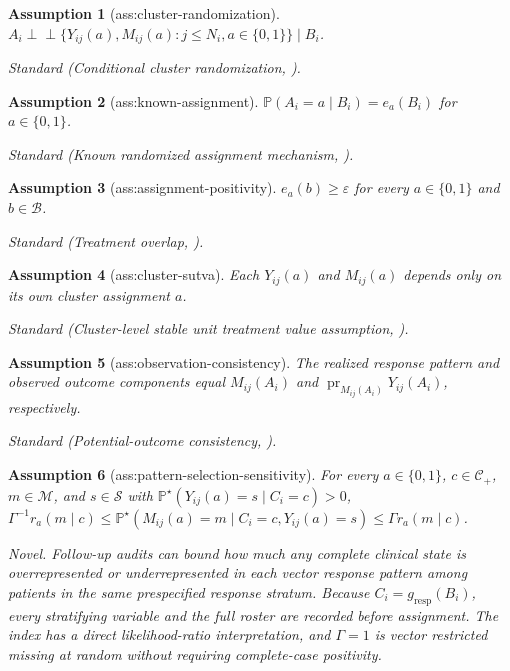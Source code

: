 \documentclass{article}
\newtheorem{assumption}{Assumption}
\begin{document}
\begin{assumption}[ass:cluster-randomization]\label{ass:cluster-randomization}
\(A_i\perp\!\!\perp\{Y_{ij}(a),M_{ij}(a):j\le N_i,a\in\{0,1\}\}\mid B_i\).
\par\smallskip\noindent\emph{Standard} (Conditional cluster randomization, \cite{WangParkSmallLi2024}).
\end{assumption}

\begin{assumption}[ass:known-assignment]\label{ass:known-assignment}
\(\mathbb P(A_i=a\mid B_i)=e_a(B_i)\) for \(a\in\{0,1\}\).
\par\smallskip\noindent\emph{Standard} (Known randomized assignment mechanism, \cite{WangParkSmallLi2024}).
\end{assumption}

\begin{assumption}[ass:assignment-positivity]\label{ass:assignment-positivity}
\(e_a(b)\ge\varepsilon\) for every \(a\in\{0,1\}\) and \(b\in\mathcal B\).
\par\smallskip\noindent\emph{Standard} (Treatment overlap, \cite{WangParkSmallLi2024}).
\end{assumption}

\begin{assumption}[ass:cluster-sutva]\label{ass:cluster-sutva}
Each \(Y_{ij}(a)\) and \(M_{ij}(a)\) depends only on its own cluster assignment \(a\).
\par\smallskip\noindent\emph{Standard} (Cluster-level stable unit treatment value assumption, \cite{HayesMoulton2017}).
\end{assumption}

\begin{assumption}[ass:observation-consistency]\label{ass:observation-consistency}
The realized response pattern and observed outcome components equal \(M_{ij}(A_i)\) and \(\operatorname{pr}_{M_{ij}(A_i)}Y_{ij}(A_i)\), respectively.
\par\smallskip\noindent\emph{Standard} (Potential-outcome consistency, \cite{Rubin1974}).
\end{assumption}

\begin{assumption}[ass:pattern-selection-sensitivity]\label{ass:pattern-selection-sensitivity}
For every \(a\in\{0,1\}\), \(c\in\mathcal C_{+}\), \(m\in\mathcal M\), and \(s\in\mathcal S\) with \(\mathbb P^{\star}(Y_{ij}(a)=s\mid C_i=c)>0\), \(\Gamma^{-1}r_a(m\mid c)\le\mathbb P^{\star}(M_{ij}(a)=m\mid C_i=c,Y_{ij}(a)=s)\le\Gamma r_a(m\mid c)\).
\par\smallskip\noindent\emph{Novel.} Follow-up audits can bound how much any complete clinical state is overrepresented or underrepresented in each vector response pattern among patients in the same prespecified response stratum. Because \(C_i=g_{\mathrm{resp}}(B_i)\), every stratifying variable and the full roster are recorded before assignment. The index has a direct likelihood-ratio interpretation, and \(\Gamma=1\) is vector restricted missing at random without requiring complete-case positivity.
\end{assumption}
\end{document}
